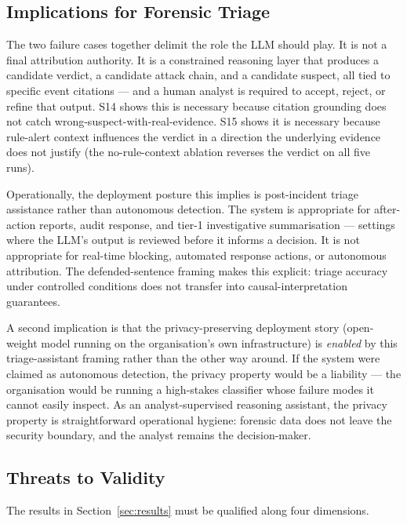 \documentclass[conference]{IEEEtran}
\begin{document}
\subsection{Implications for Forensic Triage}
\label{sec:implications}

The two failure cases together delimit the role the LLM should play. It is not a final attribution authority. It is a constrained reasoning layer that produces a candidate verdict, a candidate attack chain, and a candidate suspect, all tied to specific event citations --- and a human analyst is required to accept, reject, or refine that output. S14 shows this is necessary because citation grounding does not catch wrong-suspect-with-real-evidence. S15 shows it is necessary because rule-alert context influences the verdict in a direction the underlying evidence does not justify (the no-rule-context ablation reverses the verdict on all five runs).

Operationally, the deployment posture this implies is post-incident triage assistance rather than autonomous detection. The system is appropriate for after-action reports, audit response, and tier-1 investigative summarisation --- settings where the LLM's output is reviewed before it informs a decision. It is not appropriate for real-time blocking, automated response actions, or autonomous attribution. The defended-sentence framing makes this explicit: triage accuracy under controlled conditions does not transfer into causal-interpretation guarantees.

A second implication is that the privacy-preserving deployment story (open-weight model running on the organisation's own infrastructure) is \emph{enabled} by this triage-assistant framing rather than the other way around. If the system were claimed as autonomous detection, the privacy property would be a liability --- the organisation would be running a high-stakes classifier whose failure modes it cannot easily inspect. As an analyst-supervised reasoning assistant, the privacy property is straightforward operational hygiene: forensic data does not leave the security boundary, and the analyst remains the decision-maker.

\subsection{Threats to Validity}
\label{sec:threats}

The results in Section~\ref{sec:results} must be qualified along four dimensions.
\end{document}
